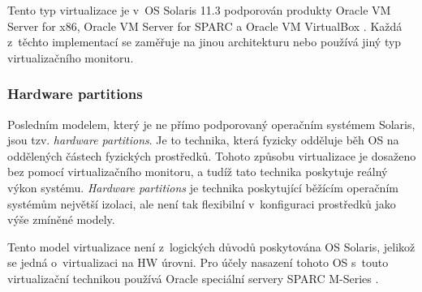 Tento typ virtualizace je v~OS Solaris 11.3 podporován produkty Oracle VM Server for x86, Oracle VM Server for SPARC a Oracle
VM VirtualBox \cite{oracle:virtualization:technologies}. Každá z~těchto implementací se zaměřuje na jinou architekturu nebo
používá jiný typ virtualizačního monitoru.
\subsubsection{Hardware partitions}
\label{chapter:solaris:virtualization:hw_partition}
Posledním modelem, který je ne přímo podporovaný operačním systémem Solaris, jsou tzv. \textit{hardware partitions}. Je to technika,
která fyzicky odděluje běh OS na oddělených částech fyzických prostředků. Tohoto způsobu virtualizace je dosaženo
bez pomocí virtualizačního monitoru, a tudíž tato technika poskytuje reálný výkon systému. \textit{Hardware partitions} je technika
poskytující běžícím operačním systémům největší izolaci, ale není tak flexibilní v~konfiguraci prostředků jako výše
zmíněné modely.

Tento model virtualizace není z~logických důvodů poskytována OS Solaris, jelikož se jedná o~virtualizaci na HW úrovni. Pro
účely nasazení tohoto OS s~touto virtualizační technikou používá Oracle speciální servery SPARC M-Series 
\cite{oracle:virtualization:technologies}.